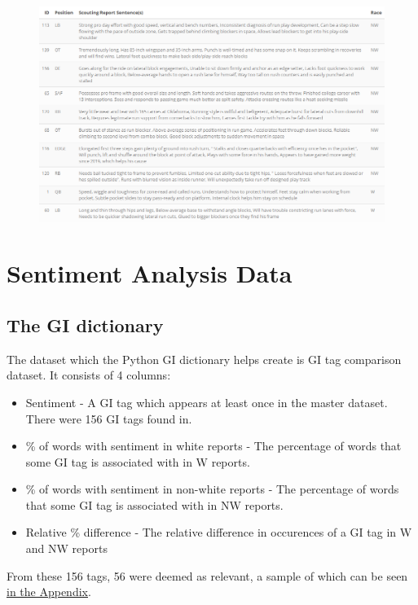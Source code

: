 \documentclass[oneside,12pt]{Classes/RoboticsLaTeX}
\begin{document}
\begin{figure}[!htb]
  \centering
  \begin{minipage}{1\textwidth}
    \centering
    \includegraphics[width=1\linewidth]{Figures/5_sentence.png}
    \label{fig:5-sentence_dataset_sample}
  \end{minipage}%
\end{figure}

\section{Sentiment Analysis Data}
\label{sec:senti_data}

\subsection{The GI dictionary}
The dataset which the Python GI dictionary helps create is GI tag comparison dataset. It consists of 4 columns:
\begin{itemize}
  \item Sentiment - A GI tag which appears at least once in the master dataset. There were 156 GI tags found in.
  \item \% of words with sentiment in white reports - The percentage of words that some GI tag is associated with in W reports.
  \item \% of words with sentiment in non-white reports - The percentage of words that some GI tag is associated with in NW reports.
  \item Relative \% difference - The relative difference in occurences of a GI tag in W and NW reports
\end{itemize}
From these 156 tags, 56 were deemed as relevant, a sample of which can be seen \hyperref[chap:Figures]{in the Appendix}.
\end{document}
